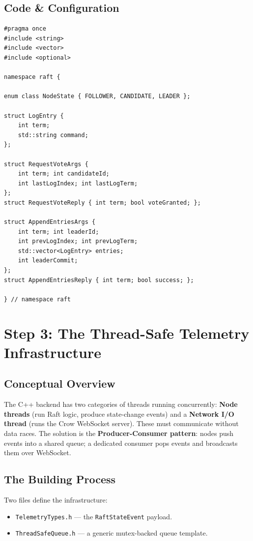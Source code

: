 \documentclass[11pt, a4paper]{article}
\begin{document}
\subsection{Code \& Configuration}
\begin{lstlisting}[style=cppstyle, caption={backend/src/raft\_core/Types.h}]
#pragma once
#include <string>
#include <vector>
#include <optional>

namespace raft {

enum class NodeState { FOLLOWER, CANDIDATE, LEADER };

struct LogEntry {
    int term;
    std::string command;
};

struct RequestVoteArgs {
    int term; int candidateId;
    int lastLogIndex; int lastLogTerm;
};
struct RequestVoteReply { int term; bool voteGranted; };

struct AppendEntriesArgs {
    int term; int leaderId;
    int prevLogIndex; int prevLogTerm;
    std::vector<LogEntry> entries;
    int leaderCommit;
};
struct AppendEntriesReply { int term; bool success; };

} // namespace raft
\end{lstlisting}

\newpage

\section{Step 3: The Thread-Safe Telemetry Infrastructure}

\subsection{Conceptual Overview}
The C++ backend has two categories of threads running concurrently:
\textbf{Node threads} (run Raft logic, produce state-change events) and a
\textbf{Network I/O thread} (runs the Crow WebSocket server). These must
communicate without data races. The solution is the
\textbf{Producer-Consumer pattern}: nodes push events into a shared queue;
a dedicated consumer pops events and broadcasts them over WebSocket.

\subsection{The Building Process}
Two files define the infrastructure:
\begin{itemize}[leftmargin=*]
    \item \texttt{TelemetryTypes.h} --- the \texttt{RaftStateEvent} payload.
    \item \texttt{ThreadSafeQueue.h} --- a generic mutex-backed queue template.
\end{itemize}
\end{document}
